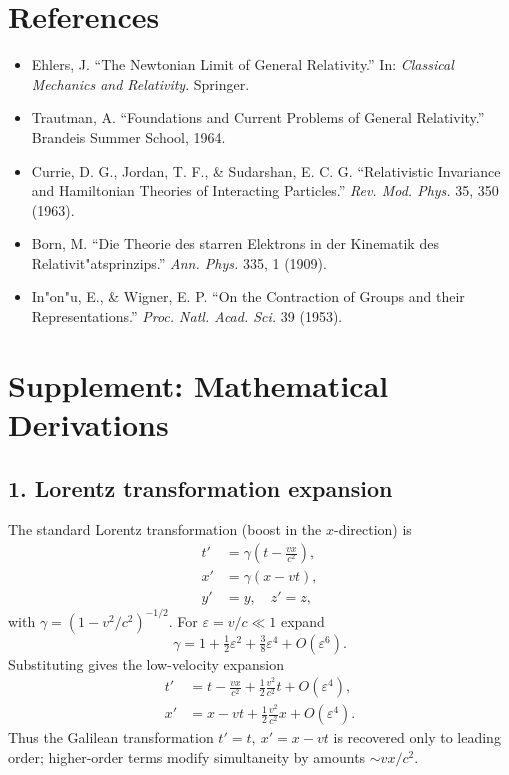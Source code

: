 \documentclass[12pt]{article}
\begin{document}
\section*{References}
\begin{itemize}
    \item Ehlers, J. ``The Newtonian Limit of General Relativity.'' In: \emph{Classical Mechanics and Relativity}. Springer.
    \item Trautman, A. ``Foundations and Current Problems of General Relativity.'' Brandeis Summer School, 1964.
    \item Currie, D. G., Jordan, T. F., \& Sudarshan, E. C. G. ``Relativistic Invariance and Hamiltonian Theories of Interacting Particles.'' \emph{Rev. Mod. Phys.} 35, 350 (1963).
    \item Born, M. ``Die Theorie des starren Elektrons in der Kinematik des Relativit"atsprinzips.'' \emph{Ann. Phys.} 335, 1 (1909).
    \item In"on"u, E., \& Wigner, E. P. ``On the Contraction of Groups and their Representations.'' \emph{Proc. Natl. Acad. Sci.} 39 (1953).
\end{itemize}

\section*{Supplement: Mathematical Derivations}
\subsection*{1. Lorentz transformation expansion}
The standard Lorentz transformation (boost in the $x$-direction) is
\begin{align}
 t' &= \gamma\left(t - \frac{v x}{c^2}\right), \\
 x' &= \gamma(x - v t), \\
 y' &= y, \quad z' = z,
\end{align}
with $\gamma=(1-v^2/c^2)^{-1/2}$. For $\varepsilon = v/c \ll 1$ expand
\begin{equation}
 \gamma = 1 + \tfrac12\varepsilon^2 + \tfrac{3}{8}\varepsilon^4 + O(\varepsilon^6).
\end{equation}
Substituting gives the low-velocity expansion
\begin{align}
 t' &= t - \frac{v x}{c^2} + \frac{1}{2}\frac{v^2}{c^2} t + O(\varepsilon^4), \\
 x' &= x - v t + \frac{1}{2}\frac{v^2}{c^2} x + O(\varepsilon^4).
\end{align}
Thus the Galilean transformation $t'=t,\ x'=x-vt$ is recovered only to leading order; higher-order terms modify simultaneity by amounts $\sim v x/c^2$.
\end{document}

